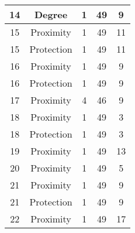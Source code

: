 \documentclass[results.tex]{subfiles}
\begin{document}
\begin{center}
\begin{tabular}{| c || c | c | c | c |}
            \hline
            14                      & Degree                       & 1                      & 49                      & 9                    \\
            \hline
            15                      & Proximity                    & 1                      & 49                      & 11                   \\
            \hline
            15                      & Protection                   & 1                      & 49                      & 11                   \\
            \hline
            16                      & Proximity                    & 1                      & 49                      & 9                    \\
            \hline
            16                      & Protection                   & 1                      & 49                      & 9                    \\
            \hline
            17                      & Proximity                    & 4                      & 46                      & 9                    \\
            \hline
            18                      & Proximity                    & 1                      & 49                      & 3                    \\
            \hline
            18                      & Protection                   & 1                      & 49                      & 3                    \\
            \hline
            19                      & Proximity                    & 1                      & 49                      & 13                   \\
            \hline
            20                      & Proximity                    & 1                      & 49                      & 5                    \\
            \hline
            21                      & Proximity                    & 1                      & 49                      & 9                    \\
            \hline
            21                      & Protection                   & 1                      & 49                      & 9                    \\
            \hline
            22                      & Proximity                    & 1                      & 49                      & 17                   \\

\end{tabular}
\end{center}
\end{document}
